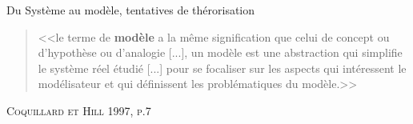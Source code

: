 \documentclass[newPxFont]{beamer}
\begin{document}
\begin{frame}[c]{Du Système au modèle, tentatives de thérorisation}
 \vspace{-1em}
  \begin{quote}
    <<le terme de \textbf{modèle} a la même signification que celui de concept ou d'hypothèse ou d'analogie [...], un modèle est une abstraction qui simplifie le système réel étudié [...] pour se focaliser sur les aspects qui intéressent le modélisateur et qui définissent les problématiques du modèle.>>
  \end{quote}
  \hspace*{\fill}\textsc{Coquillard et Hill 1997, p.7}
  \vspace{-0.5em}
  \begin{figure}
   	\centering
   		 \hspace{0.2em} %
       \hspace{0.2em} %
   		 \hspace{0.2em} %
  \end{figure}
\end{frame}
\end{document}

